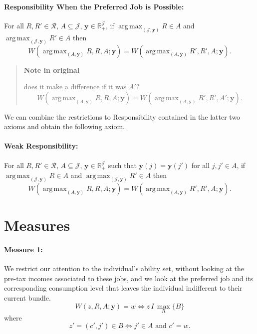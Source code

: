 \documentclass[12pt,thmsb]{article}
\DeclareMathOperator*{\argmax}{arg\,max}
\begin{document}
\paragraph{Responsibility When the Preferred Job is Possible:} For all $R,R'\in \mathcal{R}$, $A\subseteq \mathcal{J}$, $\mathbf{y} \in \mathbb{R}_{+}^{\mathcal{J}}$, if $\argmax_{(\mathcal{J},\mathbf{y})}R\in A$ and $\argmax_{(\mathcal{J},\mathbf{y})}R'\in A$ then
\begin{equation*}
W(\argmax_{(A,\mathbf{y})}R,R,A;\mathbf{y})=W(\argmax_{(A,\mathbf{y})}R',R',A;\mathbf{y}).
\end{equation*}

\begin{quote}
\textbf{Note in original}

does it make a difference if it was $A'$?
\begin{equation*}
W(\argmax_{(A,\mathbf{y})}R,R,A;\mathbf{y})=W(\argmax_{(A,\mathbf{y})}R',R',A';\mathbf{y}).
\end{equation*}
\end{quote}

We can combine the restrictions to Responsibility contained in the latter two axioms and obtain the following axiom.

\paragraph{Weak Responsibility:} For all $R,R'\in \mathcal{R}$, $A\subseteq \mathcal{J}$, $\mathbf{y} \in \mathbb{R}_{+}^{\mathcal{J}}$ such that $\mathbf{y}(j)=\mathbf{y}(j')$ for all $j,j'\in A$, if $\argmax_{(\mathcal{J},\mathbf{y})}R\in A$ and $\argmax_{(\mathcal{J},\mathbf{y})}R'\in A$ then
\begin{equation*}
W(\argmax_{(A,\mathbf{y})}R,R,A;\mathbf{y})=W(\argmax_{(A,\mathbf{y})}R',R',A;\mathbf{y}).
\end{equation*}

\section{Measures}

\paragraph{Measure 1:} We restrict our attention to the individual's ability set, without looking at the pre-tax incomes associated to these jobs, and we look at the preferred job and its corresponding consumption level that leaves the individual indifferent to their current bundle.
\begin{equation*}
W(z, R, A;\mathbf{y})=w\Leftrightarrow z\,I\,\max_R\{B\}
\end{equation*}
where
\begin{equation*}
z'=(c',j')\in B\Leftrightarrow j'\in A \textrm{ and } c'=w.
\end{equation*}
\end{document}
